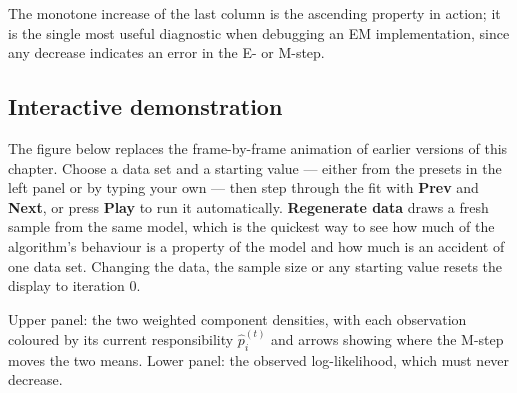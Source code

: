 \documentclass[
  letterpaper,
  DIV=11,
  numbers=noendperiod]{scrreprt}
\begin{document}
The monotone increase of the last column is the ascending property in
action; it is the single most useful diagnostic when debugging an EM
implementation, since any decrease indicates an error in the E- or
M-step.

\subsection{Interactive demonstration}\label{sec-mixture-app}

The figure below replaces the frame-by-frame animation of earlier
versions of this chapter. Choose a data set and a starting value ---
either from the presets in the left panel or by typing your own --- then
step through the fit with \textbf{Prev} and \textbf{Next}, or press
\textbf{Play} to run it automatically. \textbf{Regenerate data} draws a
fresh sample from the same model, which is the quickest way to see how
much of the algorithm's behaviour is a property of the model and how
much is an accident of one data set. Changing the data, the sample size
or any starting value resets the display to iteration 0.

Upper panel: the two weighted component densities, with each observation
coloured by its current responsibility \(\hat p_i^{(t)}\) and arrows
showing where the M-step moves the two means. Lower panel: the observed
log-likelihood, which must never decrease.
\end{document}
